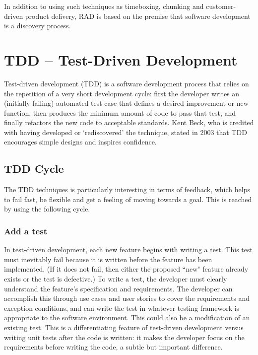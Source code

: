 In addition to using such techniques as timeboxing, chunking and customer-driven product delivery, RAD is based on the premise that software development is a discovery process.


\section{TDD -- Test-Driven Development}

Test-driven development (TDD) is a software development process that relies on the repetition of a very short development cycle: first the developer writes an (initially failing) automated test case that defines a desired improvement or new function, then produces the minimum amount of code to pass that test, and finally refactors the new code to acceptable standards. Kent Beck, who is credited with having developed or `rediscovered' the technique, stated in 2003 that TDD encourages simple designs and inspires confidence.

\subsection{TDD Cycle}

The TDD techniques is particularly interesting in terms of feedback, which helps to fail fast, be flexible and get a feeling of moving towards a goal. This is reached by using the following cycle.

\subsubsection{Add a test}

In test-driven development, each new feature begins with writing a test. This test must inevitably fail because it is written before the feature has been implemented. (If it does not fail, then either the proposed ``new" feature already exists or the test is defective.) To write a test, the developer must clearly understand the feature's specification and requirements. The developer can accomplish this through use cases and user stories to cover the requirements and exception conditions, and can write the test in whatever testing framework is appropriate to the software environment. This could also be a modification of an existing test. This is a differentiating feature of test-driven development versus writing unit tests after the code is written: it makes the developer focus on the requirements before writing the code, a subtle but important difference.

